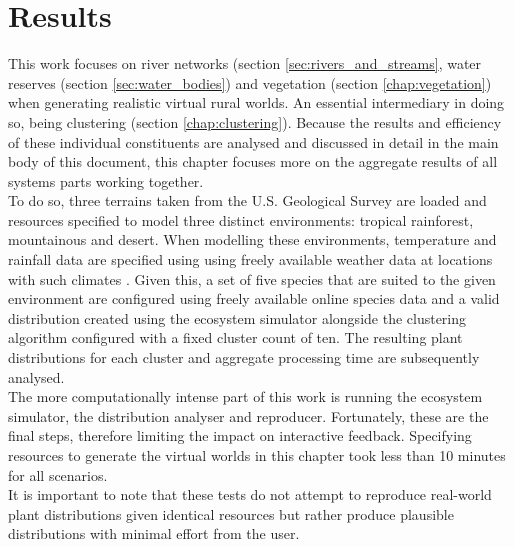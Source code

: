\chapter{Results}

This work focuses on river networks (section \ref{sec:rivers_and_streams}, water reserves (section \ref{sec:water_bodies}) and vegetation (section \ref{chap:vegetation}) when generating realistic virtual rural worlds. An essential intermediary in doing so, being clustering (section \ref{chap:clustering}). Because the results and efficiency of these individual constituents are analysed and discussed in detail in the main body of this document, this chapter focuses more on the aggregate results of all systems parts working together. \\

To do so, three terrains taken from the U.S. Geological Survey \protect\footnotemark {} are loaded and resources specified to model three distinct environments: tropical rainforest, mountainous and desert. When modelling these environments, temperature and rainfall data are specified using using freely available weather data at locations with such climates \protect\footnotemark {}. Given this, a set of five species that are suited to the given environment are configured using freely available online species data  \protect\footnotemark {} and a valid distribution created using the ecosystem simulator alongside the clustering algorithm configured with a fixed cluster count of ten. The resulting plant distributions for each cluster and aggregate processing time are subsequently analysed.\\

The more computationally intense part of this work is running the ecosystem simulator, the distribution analyser and reproducer. Fortunately, these are the final steps, therefore limiting the impact on interactive feedback. Specifying resources to generate the virtual worlds in this chapter took less than 10 minutes for all scenarios.\\

It is important to note that these tests do not attempt to reproduce real-world plant distributions given identical resources but rather produce plausible distributions with minimal effort from the user. \\

